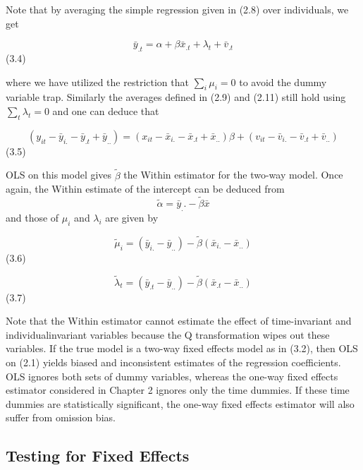 \documentclass[
]{book}
\begin{document}
Note that by averaging the simple regression given in (2.8) over individuals, we get

\begin{equation}
\bar{y}_{. t}=\alpha+\beta \bar{x}_{. t}+\lambda_{t}+\bar{v}_{. t}
\end{equation} (3.4)

where we have utilized the restriction that \(\sum_i \mu_i=0\) to avoid the dummy variable trap.
Similarly the averages defined in (2.9) and (2.11) still hold using \(\sum_t \lambda_t=0\) and one can deduce that

\begin{equation}
\left(y_{i t}-\bar{y}_{i .}-\bar{y}_{. t}+\bar{y}_{. .}\right)=\left(x_{i t}-\bar{x}_{i .}-\bar{x}_{. t}+\bar{x}_{. .}\right) \beta+\left(v_{i t}-\bar{v}_{i .}-\bar{v}_{. t}+\bar{v}_{. .}\right)
\end{equation} (3.5)

OLS on this model gives \(\widetilde {\beta}\) the Within estimator for the two-way model. Once again, the
Within estimate of the intercept can be deduced from
\[\widetilde {\alpha}=\bar{y}_..-\widetilde {\beta} \bar{x}  \]
and those of \(\mu_i\) and \(\lambda_i\) are given by

\begin{equation}
\tilde{\mu}_{i}=\left(\bar{y}_{i .}-\bar{y}_{. .}\right)-\widetilde{\beta}\left(\bar{x}_{i .}-\bar{x}_{. .}\right)
\end{equation} (3.6)

\begin{equation}
\tilde{\lambda}_{t}=\left(\bar{y}_{. t}-\bar{y}_{. .}\right)-\widetilde{\beta}\left(\bar{x}_{. t}-\bar{x}_{. .}\right)
\end{equation} (3.7)

Note that the Within estimator cannot estimate the effect of time-invariant and individualinvariant variables because the Q transformation wipes out these variables. If the true model
is a two-way fixed effects model as in (3.2), then OLS on (2.1) yields biased and inconsistent estimates of the regression coefficients. OLS ignores both sets of dummy variables, whereas the one-way fixed effects estimator considered in Chapter 2 ignores only the time dummies. If
these time dummies are statistically significant, the one-way fixed effects estimator will also
suffer from omission bias.

\hypertarget{testing-for-fixed-effects}{%
\subsection{Testing for Fixed Effects}\label{testing-for-fixed-effects}}
\end{document}
